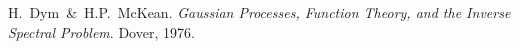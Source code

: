 \documentclass{article}
\newcommand{\tmtextit}[1]{{\itshape{#1}}}
\begin{document}
{\cite[3.8]{inverseSpectralFunctions}}

\begin{thebibliography}{1}
  H.~Dym~\&~H.P.~McKean.{\newblock}
  \tmtextit{Gaussian Processes, Function Theory, and the Inverse Spectral
  Problem}.{\newblock} Dover, 1976.{\newblock}
\end{thebibliography}

\
\end{document}
